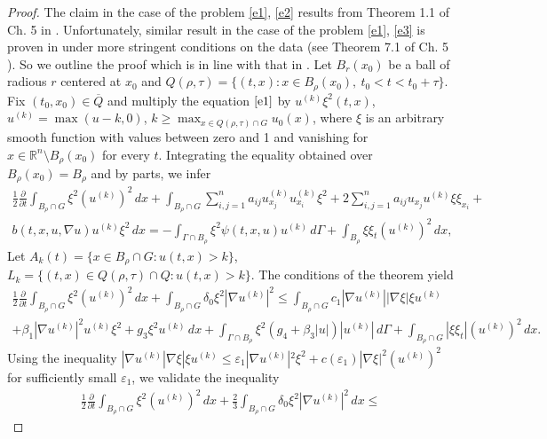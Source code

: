 \documentclass{article}
\theoremstyle{plain}
\begin{document}
\begin{proof}
The claim in the case of the problem  {\rm \eqref{e1}, \eqref{e2}} results from Theorem 1.1 of Ch. 5 in \cite{lad}. 
Unfortunately, similar result in the case of the problem 
 {\rm \eqref{e1}, \eqref{e3}} is proven in  \cite{lad} under more stringent conditions on the data  (see Theorem   7.1 of Ch. 5 \cite{lad}).
So we outline the proof which is in line with that in \cite{lad}. Let  $B_r(x_0)$ be a ball of radious  $r$ centered at  $x_0$
and $Q(\rho,\tau)=\{(t,x): x\in B_{\rho}(x_0), \ t_0<t<t_0+\tau\}$.  Fix  $(t_0,x_0)\in \overline{Q}$ and multiply the equation 
 $\eqref{e1}$ by $u^{(k)}\xi^2(t,x)$,  $u^{(k)}=\max(u-k,0)$, 
$k\geq \max_{x\in Q(\rho,\tau)\cap G} u_0(x)$,  
where  $\xi$ is an arbitrary smooth function with values between zero and 1 and vanishing for   $x\in {\mathbb R}^n \setminus  B_\rho(x_0)$ for every  $t$.
Integrating the equality obtained over   $B_{\rho}(x_0)=B_\rho$ and by parts, we infer  
 \begin{multline}\label{e23}
\frac{1}{2}\frac{\partial}{\partial t} \int_{B_\rho\cap G} \xi^2 (u^{(k)})^2\,dx +\int_{B_\rho\cap G} 
\sum_{i,j=1}^n a_{ij}u^{(k)}_{x_j}u^{(k)}_{x_i}\xi^2  + 2\sum_{i,j=1}^n a_{ij}u_{x_j}u^{(k)}\xi \xi_{x_i}+ \\
b(t,x,u,\nabla u) u^{(k)}\xi^2\,dx=-\int_{\Gamma\cap B_\rho}\xi^2 \psi(t,x,u) u^{(k)}\,d\Gamma +\int_{B_\rho} \xi\xi_t(u^{(k)})^2\,dx,  
\end{multline}
Let   $A_k(t)=\{x\in B_\rho\cap G: u(t,x)>k\}$, $L_k=\{(t,x)\in Q(\rho,\tau)\cap Q: u(t,x)>k\}$.   
The conditions of the theorem yield 
\begin{multline*}
\frac{1}{2}\frac{\partial}{\partial t} \int_{B_\rho\cap G}\xi^2 (u^{(k)})^2\,dx +
\int_{B_\rho\cap G} \delta_0\xi^2 |\nabla u^{(k)}|^2 \leq   
\int_{B_\rho\cap G} c_1|\nabla u^{(k)}| |\nabla\xi| \xi u^{(k)}\\ +\beta_1|\nabla u^{(k)}|^2 u^{(k)}\xi^2+g_3\xi^2  u^{(k)} \,dx
+ \int_{\Gamma\cap B_\rho}\xi^2 (g_4+\beta_3|u|)|u^{(k)}|\,d\Gamma + \int_{B_\rho\cap G} |\xi\xi_t|(u^{(k)})^2\,dx.
\end{multline*}
Using the inequality  $|\nabla u^{(k)}|\nabla\xi| \xi u^{(k)}\leq \varepsilon_1 |\nabla u^{(k)}|^2\xi^2+ c(\varepsilon_1)|\nabla \xi|^2( u^{(k)})^2$
for sufficiently small  $\varepsilon_1$, we validate the inequality 
\begin{multline*}
\frac{1}{2}\frac{\partial}{\partial t} \int_{B_\rho\cap G}\xi^2 (u^{(k)})^2\,dx +
\frac{2}{3} \int_{B_\rho\cap G} \delta_0\xi^2 |\nabla u^{(k)}|^2\,dx \leq 

\end{multline*}
\end{proof}
\end{document}
